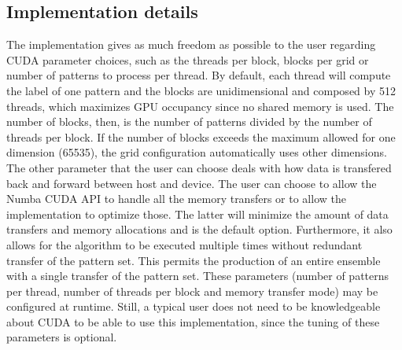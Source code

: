 \subsection{Implementation details}

The implementation gives as much freedom as possible to the user regarding CUDA parameter choices, such as the threads per block, blocks per grid or number of patterns to process per thread.
By default, each thread will compute the label of one pattern and the blocks are unidimensional and composed by 512 threads, which maximizes GPU occupancy since no shared memory is used.
The number of blocks, then, is the number of patterns divided by the number of threads per block.
If the number of blocks exceeds the maximum allowed for one dimension (65535), the grid configuration automatically uses other dimensions.
The other parameter that the user can choose deals with how data is transfered back and forward between host and device.
The user can choose to allow the Numba CUDA API to handle all the memory transfers or to allow the implementation to optimize those.
The latter will minimize the amount of data transfers and memory allocations and is the default option.
Furthermore, it also allows for the algorithm to be executed multiple times without redundant transfer of the pattern set.
This permits the production of an entire ensemble with a single transfer of the pattern set.
These parameters (number of patterns per thread, number of threads per block and memory transfer mode) may be configured at runtime.
Still, a typical user does not need to be knowledgeable about CUDA to be able to use this implementation, since the tuning of these parameters is optional.

